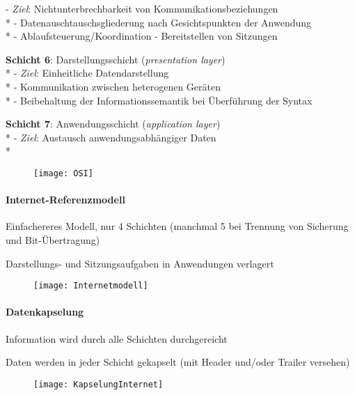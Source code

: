 \begin{items}
    - \emph{Ziel}: Nichtunterbrechbarkeit von Kommunikationsbeziehungen \\*
    - Datenauschtauschsgliederung nach Gesichtspunkten der Anwendung\\*
    - Ablaufsteuerung/Koordination
    - Bereitstellen von Sitzungen
  \item \textbf{Schicht 6}: Darstellungsschicht (\emph{presentation layer}) \\*
    - \emph{Ziel}: Einheitliche Datendarstellung \\*
    - Kommunikation zwischen heterogenen Geräten \\*
    - Beibehaltung der Informationssemantik bei Überführung der Syntax
  \item \textbf{Schicht 7}: Anwendungsschicht (\emph{application layer}) \\*
    - \emph{Ziel}: Austausch anwendungsabhängiger Daten \\*
\end{items}
\begin{figure}[H]\centering\label{OSI}\texttt{[image: OSI]}\end{figure}

\newpage

\paragraph{Internet-Referenzmodell}
\begin{items}
  \item Einfachereres Modell, nur 4 Schichten (manchmal 5 bei Trennung von Sicherung und Bit-Übertragung)
  \item Darstellungs- und Sitzungsaufgaben in Anwendungen verlagert
\end{items}
\begin{figure}[H]\centering\label{Internetmodell}\texttt{[image: Internetmodell]}\end{figure}

\paragraph{Datenkapselung}
\begin{items}
	\item Information wird durch alle Schichten durchgereicht
	\item Daten werden in jeder Schicht gekapselt (mit Header und/oder Trailer versehen)
\end{items}
\begin{figure}[H]\centering\label{KapselungInternet}\texttt{[image: KapselungInternet]}\end{figure}

